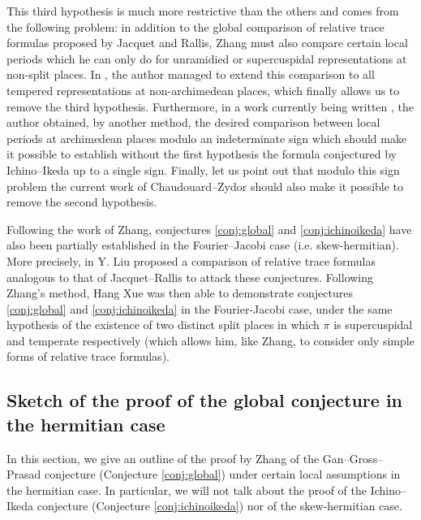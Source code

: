 This third hypothesis is much more restrictive than the others and comes from the following problem: in addition to the global comparison of relative trace formulas proposed by Jacquet and Rallis, Zhang must also compare certain local periods which he can only do for unramidied or supercuspidal representations at non-split places.
In \cite{beuzart2021comparison}, the author managed to extend this comparison to all tempered representations at non-archimedean places, which finally allows us to remove the third hypothesis.
Furthermore, in a work currently being written \cite{beuzart2017factorisations}, the author obtained, by another method, the desired comparison between local periods at archimedean places modulo an indeterminate sign which should make it possible to establish without the first hypothesis the formula conjectured by Ichino--Ikeda up to a single sign.
Finally, let us point out that modulo this sign problem the current work of Chaudouard--Zydor should also make it possible to remove the second hypothesis.

Following the work of Zhang, conjectures \ref{conj:global} and \ref{conj:ichinoikeda} have also been partially established in the Fourier--Jacobi case (i.e. skew-hermitian).
More precisely, in \cite{liu2014relative} Y. Liu proposed a comparison of relative trace formulas analogous to that of Jacquet--Rallis to attack these conjectures.
Following Zhang's method, Hang Xue \cite{xue2014gan,xue2016fourier,xue2017fourier} was then able to demonstrate conjectures \ref{conj:global} and \ref{conj:ichinoikeda} in the Fourier-Jacobi case, under the same hypothesis of the existence of two distinct split places in which $\pi$ is supercuspidal and temperate respectively (which allows him, like Zhang, to consider only simple forms of relative trace formulas).


\subsection{Sketch of the proof of the global conjecture in the hermitian case}


In this section, we give an outline of the proof by Zhang \cite{zhang2014fourier} of the Gan--Gross--Prasad conjecture (Conjecture \ref{conj:global}) under certain local assumptions in the hermitian case.
In particular, we will not talk about the proof of the Ichino--Ikeda conjecture (Conjecture \ref{conj:ichinoikeda}) nor of the skew-hermitian case.

